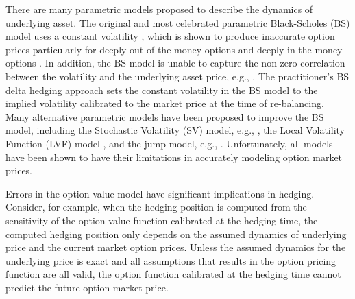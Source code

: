 \documentclass[letterpaper,12pt,titlepage,oneside,final]{book}
\numberwithin{equation}{section}
\theoremstyle{definition}
\begin{document}
There are many parametric models proposed to describe the dynamics of underlying asset.
The original and most celebrated parametric  Black-Scholes (BS) model uses a constant volatility \citep{black1973pricing,merton1973theory}, which is  shown
 to produce inaccurate option prices particularly for deeply out-of-the-money options and deeply in-the-money options \citep{genccay2003degree}.
In addition,
the BS model is unable to capture the non-zero correlation between the volatility and the underlying asset price, e.g., \citep{french1987expected,bollerslev2006leverage}.
 The practitioner's BS delta hedging approach sets the constant volatility in the BS model to the implied volatility calibrated to the market price at the time of re-balancing.  Many alternative parametric models have been proposed to improve the BS model,  including  the Stochastic Volatility (SV) model, e.g., \cite{hagan2002managing,heston1993closed,hull1987pricing,bakshi1997empirical},  the Local Volatility Function (LVF) model \citep{coleman2001,dumas1998implied,rubinstein1994implied,dupire1994pricing}, and the jump model, e.g., \citep{He06,kou2002jump}. Unfortunately, all models have been shown to have their limitations in accurately modeling option market prices.

Errors in  the option value model have significant implications in hedging. Consider, for example, when the hedging position is computed from the sensitivity of the  option value function calibrated at the hedging time, the computed hedging position only depends on the assumed dynamics of underlying price  and the current market option prices. Unless the assumed dynamics for the underlying price is exact and all assumptions that results in the option pricing function are all valid, the option function calibrated at the hedging time cannot predict the future option market price.
\end{document}
